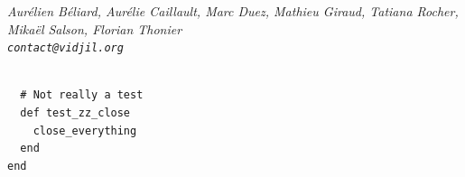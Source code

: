 \documentclass[11pt]{report}
\begin{document}





\vfill
\flushright \it Aurélien Béliard, Aurélie Caillault, Marc Duez, Mathieu Giraud, Tatiana Rocher, Mikaël Salson, Florian Thonier
\\ \texttt{contact@vidjil.org}


\begin{verbatim}

  # Not really a test
  def test_zz_close
    close_everything
  end
end
\end{verbatim}
\end{document}
